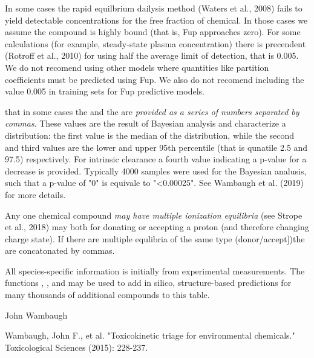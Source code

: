 \documentclass[a4paper]{book}
\begin{document}
%
\begin{Details}\relax
In some cases the rapid equilbrium dailysis method (Waters et al., 2008)
fails to yield detectable concentrations for the free fraction of chemical. 
In those cases we assume the compound is highly bound (that is, Fup approaches
zero). For some calculations (for example, steady-state plasma concentration)
there is precendent (Rotroff et al., 2010) for using half the average limit 
of detection, that is 0.005. We do not recomend using other models where 
quantities like partition coefficients must be predicted using Fup. We also
do not recomend including the value 0.005 in training sets for Fup predictive
models. 

 that in some cases the  and the 
 are
\emph{provided as a series of numbers separated by commas}. These values are the 
result of Bayesian analysis and characterize a distribution: the first value
is the median of the distribution, while the second and third values are the 
lower and upper 95th percentile (that is qunatile 2.5 and 97.5) respectively.
For intrinsic clearance a fourth value indicating a p-value for a decrease is
provided. Typically 4000 samples were used for the Bayesian analusis, such
that a p-value of "0" is equivale to "<0.00025". See Wambaugh et al. (2019)
for more details.

Any one chemical compound \emph{may have multiple ionization equilibria} 
(see Strope et al., 2018) may both for donating or accepting a proton (and
therefore changing charge state). If there are multiple equlibria of the same
type (donor/accept])the are concatonated by commas.

All species-specific information is initially from experimental measurements.
The functions , , 
and  may be used to add in silico, structure-based
predictions for many thousands of additional compounds to this table.
\end{Details}
%
\begin{Author}\relax
John Wambaugh
\end{Author}
%
\begin{Source}\relax
Wambaugh, John F., et al. "Toxicokinetic triage for environmental
chemicals." Toxicological Sciences (2015): 228-237.
\end{Source}
%
\end{document}
